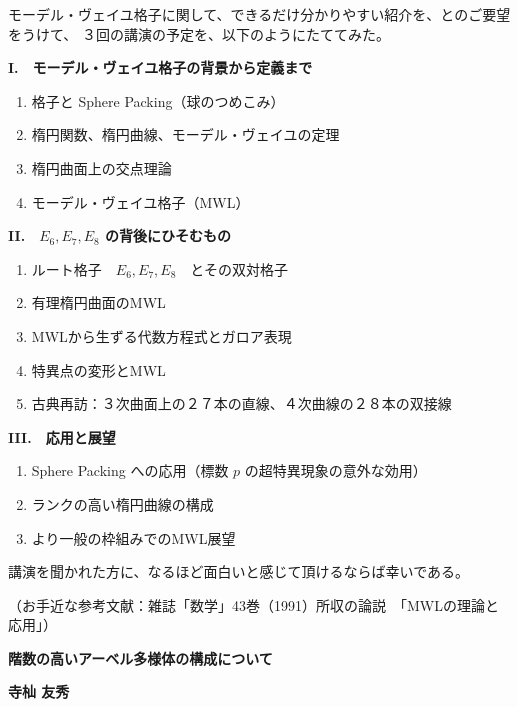 \documentclass[uplatex,dvipdfmx]{jlreq}
\begin{document}
\bigskip

モーデル・ヴェイユ格子に関して、できるだけ分かりやすい紹介を、とのご要望をうけて、
３回の講演の予定を、以下のようにたててみた。

\bigskip\bigskip

\noindent\textbf{I\@.　モーデル・ヴェイユ格子の背景から定義まで}
\begin{enumerate}
  \setlength{\itemsep}{0pt}
  \item 格子と Sphere Packing（球のつめこみ）
  \item 楕円関数、楕円曲線、モーデル・ヴェイユの定理
  \item 楕円曲面上の交点理論
  \item モーデル・ヴェイユ格子（MWL）
\end{enumerate}

\bigskip

\noindent\textbf{II\@.　$E_6, E_7, E_8$ の背後にひそむもの}
\begin{enumerate}
  \setlength{\itemsep}{0pt}
  \item ルート格子　$E_6, E_7, E_8$　とその双対格子
  \item 有理楕円曲面のMWL
  \item MWLから生ずる代数方程式とガロア表現
  \item 特異点の変形とMWL
  \item 古典再訪：３次曲面上の２７本の直線、４次曲線の２８本の双接線
\end{enumerate}

\bigskip

\noindent\textbf{III\@.　応用と展望}
\begin{enumerate}
  \setlength{\itemsep}{0pt}
  \item Sphere Packing への応用（標数 $p$ の超特異現象の意外な効用）
  \item ランクの高い楕円曲線の構成
  \item より一般の枠組みでのMWL展望
\end{enumerate}

\bigskip\bigskip

講演を聞かれた方に、なるほど面白いと感じて頂けるならば幸いである。

\bigskip

\noindent
（お手近な参考文献：雑誌「数学」43巻（1991）所収の論説　「MWLの理論と応用」）

\newpage

\begin{center}
  {\large\bfseries 階数の高いアーベル多様体の構成について}
\end{center}
\begin{flushright}
  \textbf{寺杣 友秀}
\end{flushright}
\end{document}
